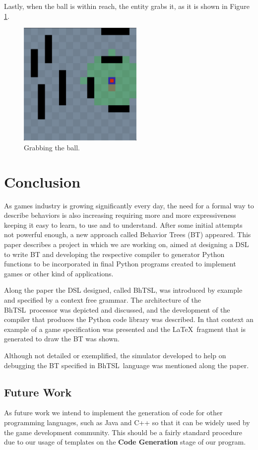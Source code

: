 \documentclass[a4paper,UKenglish,cleveref, autoref, thm-restate]{oasics-v2019}
\def\bht{BhTSL}
\begin{document}
Lastly, when the ball is within reach, the entity grabs it, as it is shown in Figure \ref{fig:grabbing}.

\begin{figure}
    \centering
    \includegraphics[width=6cm]{Grabbing.png}
    \caption{Grabbing the ball.}
    \label{fig:grabbing}
\end{figure}


\section{Conclusion}
\label{sec:conclusion}

As games industry is growing significantly every day, the need for a formal way to describe behaviors  
is also increasing requiring more and more expressiveness keeping it easy to learn, to use and to understand.
After some initial attempts not powerful enough, a new approach called Behavior Trees (BT) appeared.
This paper describes a project in which we are working on, aimed at designing a DSL to write BT
and developing the respective compiler to generator Python functions to be incorporated in final Python
programs created to implement games or other kind of applications.

Along the paper the DSL designed, called \bht, was introduced by example and specified by a context 
free grammar. 
The architecture of the \bht\ processor was depicted and discussed, and the development of the compiler that produces the
Python code library  was described.
In that context an example of a game  specification was presented and the \LaTeX\ fragment that is
 generated to draw the BT was shown.
 
Although not detailed or exemplified, the simulator developed to help on debugging the BT specified in
\bht\ language was mentioned along the paper. 

\subsection{Future Work}
As future work we intend to implement the generation of code for other programming languages, such as Java and C++ so that it can be widely used by the game development community.
This should be a fairly standard procedure due to our usage of templates on the \textbf{Code Generation} stage of our program.
\end{document}
